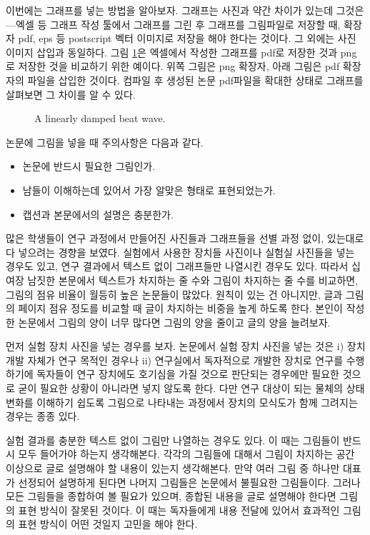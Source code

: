 \documentclass{gshs-report-v1.1}
\begin{document}
이번에는 그래프를 넣는 방법을 알아보자. 그래프는 사진과 약간 차이가 있는데 그것은---엑셀 등 그래프 작성 툴에서 그래프를 그린 후 그래프를 그림파일로 저장할 때, 확장자 pdf, eps 등 postscript 벡터 이미지로 저장을 해야 한다는 것이다. 그 외에는 사진 이미지 삽입과 동일하다. 그림 \ref{Fig01}은 엑셀에서 작성한 그래프를 pdf로 저장한 것과 png로 저장한 것을 비교하기 위한 예이다. 위쪽 그림은 png 확장자, 아래 그림은 pdf 확장자의 파일을 삽입한 것이다. 컴파일 후 생성된 논문 pdf파일을 확대한 상태로 그래프를 살펴보면 그 차이를 알 수 있다.


\begin{figure}[t]
	\begin{center}
		\caption{A linearly damped beat wave.} \label{Fig01}
	\end{center}
\end{figure}

논문에 그림을 넣을 때 주의사항은 다음과 같다.
\begin{itemize}
	\item{논문에 반드시 필요한 그림인가.}
	\item{남들이 이해하는데 있어서 가장 알맞은 형태로 표현되었는가.}
	\item{캡션과 본문에서의 설명은 충분한가.}
\end{itemize}
많은 학생들이 연구 과정에서 만들어진 사진들과 그래프들을 선별 과정 없이, 있는대로 다 넣으려는 경향을 보였다. 실험에서 사용한 장치들 사진이나 실험실 사진들을 넣는 경우도 있고, 연구 결과에서 텍스트 없이 그래프들만 나열시킨 경우도 있다. 따라서 십여장 남짓한 본문에서 텍스트가 차지하는 줄 수와 그림이 차지하는 줄 수를 비교하면, 그림의 점유 비율이 월등히 높은 논문들이 많았다. 원칙이 있는 건 아니지만, 글과 그림의 페이지 점유 정도를 비교할 때 글이 차지하는 비중을 높게 하도록 한다. 본인이 작성한 논문에서 그림의 양이 너무 많다면 그림의 양을 줄이고 글의 양을 늘려보자.

먼저 실험 장치 사진을 넣는 경우를 보자. 논문에서 실험 장치 사진을 넣는 것은 i) 장치 개발 자체가 연구 목적인 경우나 ii) 연구실에서 독자적으로 개발한 장치로 연구를 수행하기에 독자들이 연구 장치에도 호기심을 가질 것으로 판단되는 경우에만 필요한 것으로 굳이 필요한 상황이 아니라면 넣지 않도록 한다. 다만 연구 대상이 되는 물체의 상태 변화를 이해하기 쉽도록 그림으로 나타내는 과정에서 장치의 모식도가 함께 그려지는 경우는 종종 있다.

실험 결과를 충분한 텍스트 없이 그림만 나열하는 경우도 있다. 이 때는 그림들이 반드시 모두 들어가야 하는지 생각해본다. 각각의 그림들에 대해서 그림이 차지하는 공간 이상으로 글로 설명해야 할 내용이 있는지 생각해본다. 만약 여러 그림 중 하나만 대표가 선정되어 설명하게 된다면 나머지 그림들은 논문에서 불필요한 그림들이다. 그러나 모든 그림들을 종합하여 볼 필요가 있으며, 종합된 내용을 글로 설명해야 한다면 그림의 표현 방식이 잘못된 것이다. 이 때는 독자들에게 내용 전달에 있어서 효과적인 그림의 표현 방식이 어떤 것일지 고민을 해야 한다.
\end{document}
